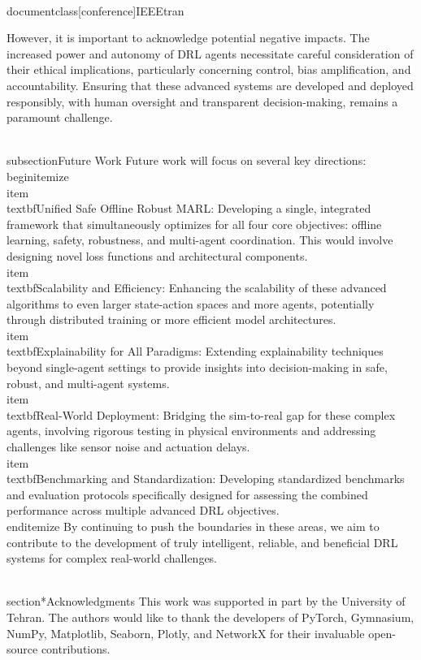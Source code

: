 \\documentclass[conference]{IEEEtran}
\begin{document}
However, it is important to acknowledge potential negative impacts. The increased power and autonomy of DRL agents necessitate careful consideration of their ethical implications, particularly concerning control, bias amplification, and accountability. Ensuring that these advanced systems are developed and deployed responsibly, with human oversight and transparent decision-making, remains a paramount challenge.

\\subsection{Future Work}
Future work will focus on several key directions:
\\begin{itemize}
    \\item \\textbf{Unified Safe Offline Robust MARL:} Developing a single, integrated framework that simultaneously optimizes for all four core objectives: offline learning, safety, robustness, and multi-agent coordination. This would involve designing novel loss functions and architectural components.
    \\item \\textbf{Scalability and Efficiency:} Enhancing the scalability of these advanced algorithms to even larger state-action spaces and more agents, potentially through distributed training or more efficient model architectures.
    \\item \\textbf{Explainability for All Paradigms:} Extending explainability techniques beyond single-agent settings to provide insights into decision-making in safe, robust, and multi-agent systems.
    \\item \\textbf{Real-World Deployment:} Bridging the sim-to-real gap for these complex agents, involving rigorous testing in physical environments and addressing challenges like sensor noise and actuation delays.
    \\item \\textbf{Benchmarking and Standardization:} Developing standardized benchmarks and evaluation protocols specifically designed for assessing the combined performance across multiple advanced DRL objectives.
\\end{itemize}
By continuing to push the boundaries in these areas, we aim to contribute to the development of truly intelligent, reliable, and beneficial DRL systems for complex real-world challenges.

\\section*{Acknowledgments}
This work was supported in part by the University of Tehran. The authors would like to thank the developers of PyTorch, Gymnasium, NumPy, Matplotlib, Seaborn, Plotly, and NetworkX for their invaluable open-source contributions.
\end{document}
